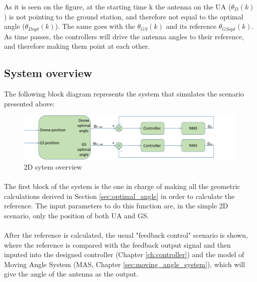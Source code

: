 As it is seen on the figure, at the starting time k the antenna on the UA ($\theta_{D} (k)$) is not pointing to the ground station, and therefore not equal to the optimal angle ($\theta_{Dopt}(k)$). The same goes with the $\theta_{GS}(k)$ and its reference $\theta_{GSopt}(k)$. As time passes, the controllers will drive the antenna angles to their reference, and therefore making them point at each other. 

\subsection*{System overview}
The following block diagram represents the system that simulates the scenario presented above:
\begin{figure}[H]
	\centering
	\includegraphics[scale=0.42]{figures/2d_system.png}
	\caption{2D sytem overview}
	\label{fig:2d_system}
\end{figure}

\paragraph{} The first block of the system is the one in charge of making all the geometric calculations derived in Section \ref{sec:optimal_angle} in order to calculate the reference. The input parameters to do this function are, in the simple 2D scenario, only the position of both UA and GS.

\paragraph{} After the reference is calculated, the usual "feedback control" scenario is shown, where the reference is compared with the feedback output signal and then inputed into the designed controller (Chapter \ref{ch:controller}) and the model of Moving Angle System (MAS, Chapter \ref{sec:moving_angle_system}), which will give the angle of the antenna as the output.


